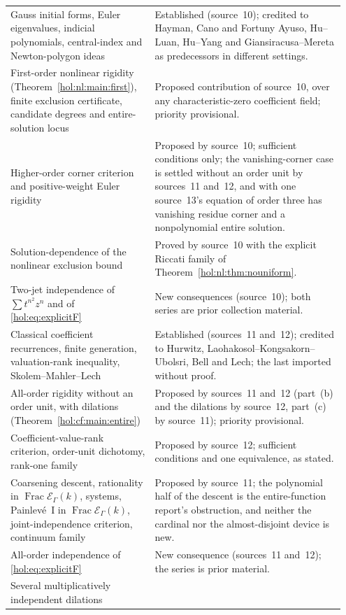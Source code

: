 \documentclass[11pt]{article}
\numberwithin{equation}{section}
\theoremstyle{definition}
\theoremstyle{remark}
\newcommand{\EK}{\mathcal E_\Gamma(k)}
\newcommand{\FE}{\operatorname{Frac}\EK}
\begin{document}
\begin{longtable}{@{}>{\raggedright\arraybackslash}p{0.40\linewidth}
                    >{\raggedright\arraybackslash}p{0.55\linewidth}@{}}
Gauss initial forms, Euler eigenvalues, indicial polynomials, central-index
and Newton-polygon ideas & Established (source~10); credited to Hayman, Cano
and Fortuny Ayuso, Hu--Luan, Hu--Yang and Giansiracusa--Mereta as
predecessors in different settings.\\[4pt]
First-order nonlinear rigidity (Theorem~\ref{hol:nl:main:first}), finite
exclusion certificate, candidate degrees and entire-solution locus &
Proposed contribution of source~10, over any characteristic-zero coefficient
field; priority provisional.\\[4pt]
Higher-order corner criterion and positive-weight Euler rigidity & Proposed
by source~10; sufficient conditions only; the vanishing-corner case is
settled without an order unit by sources~11 and~12, and with one source~13's
equation of order three has vanishing residue corner and a nonpolynomial
entire solution.\\[4pt]
Solution-dependence of the nonlinear exclusion bound & Proved by source~10
with the explicit Riccati family of
Theorem~\ref{hol:nl:thm:nouniform}.\\[4pt]
Two-jet independence of $\sum t^{n^2}z^n$ and of
\eqref{hol:eq:explicitF} & New consequences (source~10); both series are
prior collection material.\\[4pt]
Classical coefficient recurrences, finite generation, valuation-rank
inequality, Skolem--Mahler--Lech & Established (sources~11 and~12); credited
to Hurwitz, Laohakosol--Kongsakorn--Ubolsri, Bell and Lech; the last imported
without proof.\\[4pt]
All-order rigidity without an order unit, with dilations
(Theorem~\ref{hol:cf:main:entire}) & Proposed by sources~11 and~12 (part~(b)
and the dilations by source~12, part~(c) by source~11); priority
provisional.\\[4pt]
Coefficient-value-rank criterion, order-unit dichotomy, rank-one family &
Proposed by source~12; sufficient conditions and one equivalence, as
stated.\\[4pt]
Coarsening descent, rationality in $\FE$, systems, Painlev\'e~I in $\FE$,
joint-independence criterion, continuum family & Proposed by source~11; the
polynomial half of the descent is the entire-function report's obstruction,
and neither the cardinal nor the almost-disjoint device is new.\\[4pt]
All-order independence of \eqref{hol:eq:explicitF} &
New consequence (sources~11 and~12); the series is prior material.\\[4pt]
Several multiplicatively independent dilations

\end{longtable}
\end{document}
